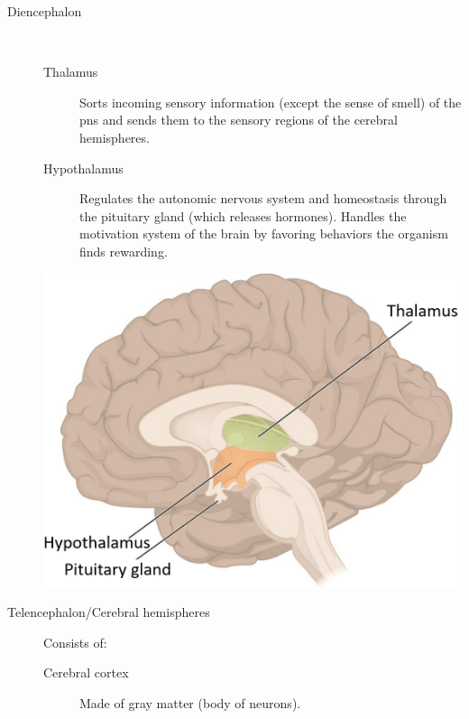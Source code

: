 \begin{description}
\begin{description}
        \item[Diencephalon]  
            \phantom{}\\
            \begin{minipage}{0.6\linewidth}
                \begin{description}
                    \item[Thalamus] 
                        Sorts incoming sensory information (except the sense of smell) of the \acl{pns} and 
                        sends them to the sensory regions of the cerebral hemispheres.
                    \item[Hypothalamus] 
                        Regulates the autonomic nervous system and homeostasis through the pituitary gland (which releases hormones).
                        Handles the motivation system of the brain by favoring behaviors the organism finds rewarding.
                \end{description}
            \end{minipage}
            \begin{minipage}{0.35\linewidth}
                \centering
                \includegraphics[width=\linewidth]{./img/diencephalon.png}
            \end{minipage}

        \item[Telencephalon/Cerebral hemispheres] 
            Consists of:
            \begin{description}
                \item[Cerebral cortex] 
                    Made of gray matter (body of neurons).


\end{description}
\end{description}
\end{description}
